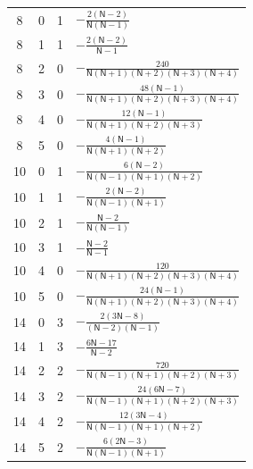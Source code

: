 \documentclass{amsart}
\theoremstyle{definition}
\theoremstyle{remark}
\numberwithin{equation}{section}
\begin{document}
{\begin{longtable}{cccl}
8&0&1&$\displaystyle -\frac{2(\mathsf N - 2)}{\mathsf N(\mathsf N - 1)}$\\
8&1&1&$\displaystyle -\frac{2(\mathsf N - 2)}{\mathsf N - 1}$\\
8&2&0&$\displaystyle -\frac{240}{\mathsf N(\mathsf N + 1)(\mathsf N + 2)(\mathsf N + 3)(\mathsf N + 4)}$\\
8&3&0&$\displaystyle -\frac{48(\mathsf N - 1)}{\mathsf N(\mathsf N + 1)(\mathsf N + 2)(\mathsf N + 3)(\mathsf N + 4)}$\\
8&4&0&$\displaystyle -\frac{12(\mathsf N - 1)}{\mathsf N(\mathsf N + 1)(\mathsf N + 2)(\mathsf N + 3)}$\\
8&5&0&$\displaystyle -\frac{4(\mathsf N - 1)}{\mathsf N(\mathsf N + 1)(\mathsf N + 2)}$\\
10&0&1&$\displaystyle -\frac{6(\mathsf N - 2)}{\mathsf N(\mathsf N - 1)(\mathsf N + 1)(\mathsf N + 2)}$\\
10&1&1&$\displaystyle -\frac{2(\mathsf N - 2)}{\mathsf N(\mathsf N - 1)(\mathsf N + 1)}$\\
10&2&1&$\displaystyle -\frac{\mathsf N - 2}{\mathsf N(\mathsf N - 1)}$\\
10&3&1&$\displaystyle -\frac{\mathsf N - 2}{\mathsf N - 1}$\\
10&4&0&$\displaystyle -\frac{120}{\mathsf N(\mathsf N + 1)(\mathsf N + 2)(\mathsf N + 3)(\mathsf N + 4)}$\\
10&5&0&$\displaystyle -\frac{24(\mathsf N - 1)}{\mathsf N(\mathsf N + 1)(\mathsf N + 2)(\mathsf N + 3)(\mathsf N + 4)}$\\
14&0&3&$\displaystyle -\frac{2(3\mathsf N - 8)}{(\mathsf N - 2)(\mathsf N - 1)}$\\
14&1&3&$\displaystyle -\frac{6\mathsf N - 17}{\mathsf N - 2}$\\
14&2&2&$\displaystyle -\frac{720}{\mathsf N(\mathsf N - 1)(\mathsf N + 1)(\mathsf N + 2)(\mathsf N + 3)}$\\
14&3&2&$\displaystyle -\frac{24(6\mathsf N - 7)}{\mathsf N(\mathsf N - 1)(\mathsf N + 1)(\mathsf N + 2)(\mathsf N + 3)}$\\
14&4&2&$\displaystyle -\frac{12(3\mathsf N - 4)}{\mathsf N(\mathsf N - 1)(\mathsf N + 1)(\mathsf N + 2)}$\\
14&5&2&$\displaystyle -\frac{6(2\mathsf N - 3)}{\mathsf N(\mathsf N - 1)(\mathsf N + 1)}$\\
\end{longtable}}
\end{document}
